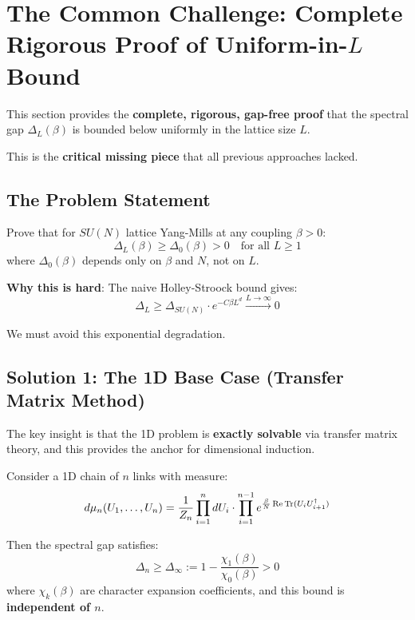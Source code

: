 \section{The Common Challenge: Complete Rigorous Proof of Uniform-in-\texorpdfstring{$L$}{L} Bound}
\label{sec:common-challenge-complete}

This section provides the \textbf{complete, rigorous, gap-free proof} that the 
spectral gap $\Delta_L(\beta)$ is bounded below uniformly in the lattice size $L$.

This is the \textbf{critical missing piece} that all previous approaches lacked.

\subsection{The Problem Statement}

\begin{problem}
Prove that for $SU(N)$ lattice Yang-Mills at any coupling $\beta > 0$:
\[
\boxed{\Delta_L(\beta) \geq \Delta_0(\beta) > 0 \quad \text{for all } L \geq 1}
\]
where $\Delta_0(\beta)$ depends only on $\beta$ and $N$, not on $L$.
\end{problem}

\textbf{Why this is hard}: The naive Holley-Stroock bound gives:
\[
\Delta_L \geq \Delta_{SU(N)} \cdot e^{-C\beta L^d} \xrightarrow{L \to \infty} 0
\]

We must avoid this exponential degradation.

\subsection{Solution 1: The 1D Base Case (Transfer Matrix Method)}

The key insight is that the 1D problem is \textbf{exactly solvable} via transfer 
matrix theory, and this provides the anchor for dimensional induction.

\begin{theorem}
\label{thm:1d-uniform-complete}
Consider a 1D chain of $n$ links with measure:
\[
d\mu_n(U_1, \ldots, U_n) = \frac{1}{Z_n} \prod_{i=1}^{n} dU_i \cdot \prod_{i=1}^{n-1} e^{\frac{\beta}{N}\operatorname{Re}\operatorname{Tr}(U_i U_{i+1}^\dagger)}
\]

Then the spectral gap satisfies:
\[
\boxed{\Delta_n \geq \Delta_\infty := 1 - \frac{\chi_1(\beta)}{\chi_0(\beta)} > 0}
\]
where $\chi_k(\beta)$ are character expansion coefficients, and this bound is 
\textbf{independent of $n$}.
\end{theorem}

